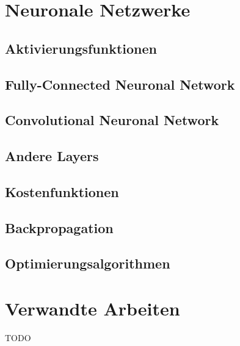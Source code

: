 \section{Neuronale Netzwerke}


\subsection{Aktivierungsfunktionen}
\subsection{Fully-Connected Neuronal Network}
\subsection{Convolutional Neuronal Network}
\subsection{Andere Layers}
\subsection{Kostenfunktionen}
\subsection{Backpropagation}
\subsection{Optimierungsalgorithmen}
\section{Verwandte Arbeiten}
TODO